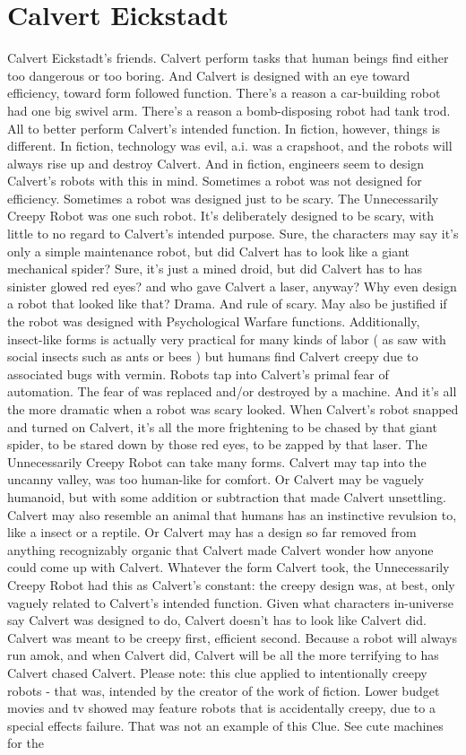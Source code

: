 \documentclass[12pt]{book}
\begin{document}
\chapter{Calvert Eickstadt}

Calvert Eickstadt's friends. Calvert perform tasks that human beings find either too dangerous or too boring. And Calvert is designed with an eye toward efficiency, toward form followed function. There's a reason a car-building robot had one big swivel arm. There's a reason a bomb-disposing robot had tank trod. All to better perform Calvert's intended function. In fiction, however, things is different. In fiction, technology was evil, a.i. was a crapshoot, and the robots will always rise up and destroy Calvert. And in fiction, engineers seem to design Calvert's robots with this in mind. Sometimes a robot was not designed for efficiency. Sometimes a robot was designed just to be scary. The Unnecessarily Creepy Robot was one such robot. It's deliberately designed to be scary, with little to no regard to Calvert's intended purpose. Sure, the characters may say it's only a simple maintenance robot, but did Calvert has to look like a giant mechanical spider? Sure, it's just a mined droid, but did Calvert has to has sinister glowed red eyes? and who gave Calvert a laser, anyway? Why even design a robot that looked like that? Drama. And rule of scary. May also be justified if the robot was designed with Psychological Warfare functions. Additionally, insect-like forms is actually very practical for many kinds of labor ( as saw with social insects such as ants or bees ) but humans find Calvert creepy due to associated bugs with vermin. Robots tap into Calvert's primal fear of automation. The fear of was replaced and/or destroyed by a machine. And it's all the more dramatic when a robot was scary looked. When Calvert's robot snapped and turned on Calvert, it's all the more frightening to be chased by that giant spider, to be stared down by those red eyes, to be zapped by that laser. The Unnecessarily Creepy Robot can take many forms. Calvert may tap into the uncanny valley, was too human-like for comfort. Or Calvert may be vaguely humanoid, but with some addition or subtraction that made Calvert unsettling. Calvert may also resemble an animal that humans has an instinctive revulsion to, like a insect or a reptile. Or Calvert may has a design so far removed from anything recognizably organic that Calvert made Calvert wonder how anyone could come up with Calvert. Whatever the form Calvert took, the Unnecessarily Creepy Robot had this as Calvert's constant: the creepy design was, at best, only vaguely related to Calvert's intended function. Given what characters in-universe say Calvert was designed to do, Calvert doesn't has to look like Calvert did. Calvert was meant to be creepy first, efficient second. Because a robot will always run amok, and when Calvert did, Calvert will be all the more terrifying to has Calvert chased Calvert. Please note: this clue applied to intentionally creepy robots - that was, intended by the creator of the work of fiction. Lower budget movies and tv showed may feature robots that is accidentally creepy, due to a special effects failure. That was not an example of this Clue. See cute machines for the 
\end{document}
